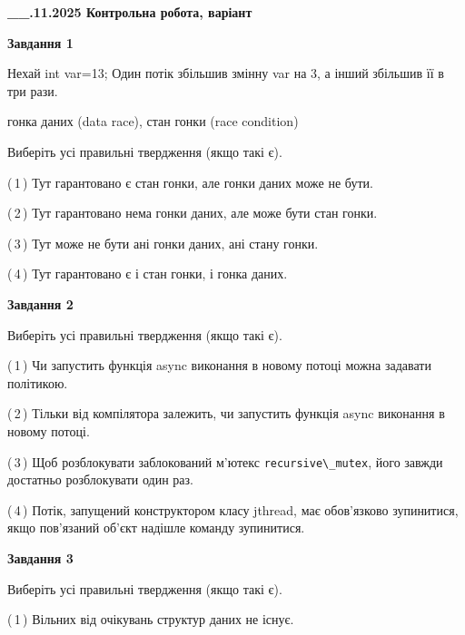 \documentclass[12pt, ukrainian]{article}
\def\code#1{\Verb!#1!}
\begin{document}
\begin {large}

\textbf{\_\_.11.2025 Контрольна робота, варіант  }\par


{

\begin{center}
\textbf{Завдання 1}
\end{center}
Нехай int var=13; Один потік збільшив змінну var на 3, а інший збільшив її в три рази.

гонка даних (data race), стан гонки (race condition)

Виберіть усі правильні твердження (якщо такі є).\par
\vspace{2mm}
(\,1\,) Тут гарантовано є стан гонки, але гонки даних може не бути.%

(\,2\,) Тут гарантовано нема гонки даних, але може бути стан гонки.%

(\,3\,) Тут може не бути ані гонки даних, ані стану гонки.%

(\,4\,) Тут гарантовано є і стан гонки, і гонка даних.%



\begin{center}
\textbf{Завдання 2}
\end{center}
Виберіть усі правильні твердження (якщо такі є).\par
\vspace{2mm}

(\,1\,) Чи запустить функція  async виконання в новому потоці можна задавати політикою.%

(\,2\,) Тільки від компілятора залежить, чи запустить функція async виконання в новому потоці.%

(\,3\,) Щоб розблокувати заблокований м’ютекс \code{recursive\_mutex}, його завжди достатньо розблокувати один раз.%

(\,4\,) Потік, запущений конструктором класу jthread, має обов’язково зупинитися, якщо пов’язаний об’єкт надішле команду зупинитися.%



\begin{center}
\textbf{Завдання 3}
\end{center}
Виберіть усі правильні твердження (якщо такі є).\par
\vspace{2mm}

(\,1\,) Вільних від очікувань структур даних не існує.%

}
\end{large}
\end{document}
